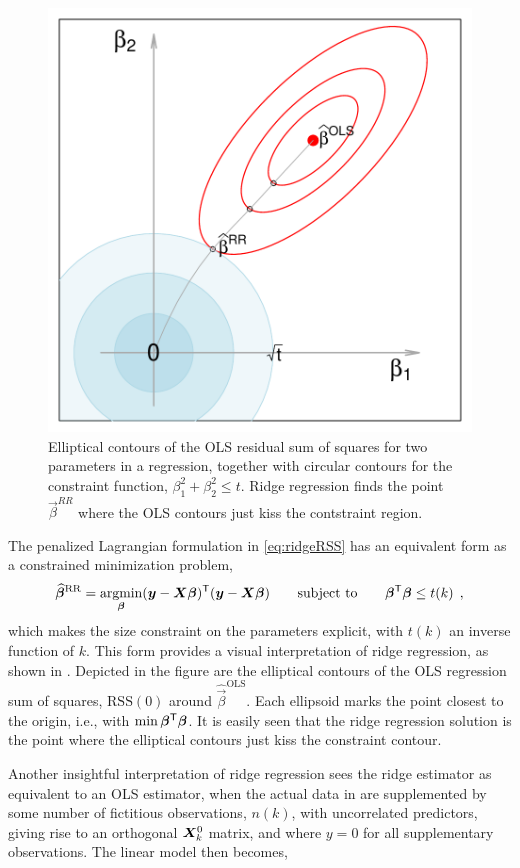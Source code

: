 \begin{figure}[htb!]
  \centering
  \includegraphics[width=.6\textwidth,clip]{fig/ridge-demo}
  \caption{Elliptical contours of the OLS residual sum of squares for two parameters in a regression, together with
  circular contours for the constraint function, $\beta_1^2 + \beta_2^2 \le t$. Ridge regression finds the point $\vec{\beta}^{RR}$ where
  the OLS contours just kiss the contstraint region.}%
  \label{fig:ridge-demo}
\end{figure}
The penalized Lagrangian formulation in \eqref{eq:ridgeRSS} has an equivalent form as a constrained
minimization problem,
\begin{equation}
\widehat{\bm{\beta}}^{\mathrm{RR}} = \mathop{\mathrm{argmin}}_{\bm{\beta}} (\bm{y}-\bm{X} \bm{\beta}) ^\mathsf{T}  (\bm{y}-\bm{X} \bm{\beta})
  \quad\quad\mbox{subject to}\quad\quad
   \bm{\beta}^\mathsf{T} \bm{\beta} \le t(k)  \:\: , \label{eq:ridge}
\end{equation}
which makes the size constraint on the parameters explicit, with $t(k)$ an inverse function of $k$. This form provides
a visual interpretation of ridge regression, as shown in . Depicted in the figure are the
elliptical contours of the OLS regression sum of squares, $\mathrm{RSS}(0)$ around $\widehat{\vec{\beta}}^{\mathrm{OLS}}$.  Each
ellipsoid marks the point closest to the origin, i.e., with $\min \bm{\beta}^\mathsf{T} \bm{\beta}$.
It is easily seen that the ridge regression solution is the point where the elliptical contours just kiss the
constraint contour.

Another insightful interpretation of ridge regression \citep{Marquardt:1970} sees the ridge estimator as equivalent to
an OLS estimator, when the actual data in  are supplemented by some number of fictitious observations, $n(k)$,
with uncorrelated predictors,
giving rise to
an orthogonal $\bm{X}_k^0$ matrix, and where $y=0$ for all supplementary observations. The linear model then becomes,

